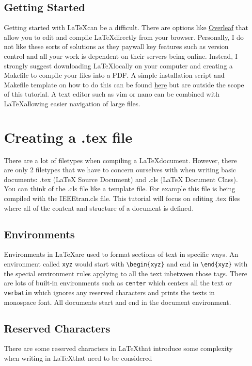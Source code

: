 \documentclass[12pt,journal,compsoc]{IEEEtran}
\begin{document}
\subsection{Getting Started}
Getting started with \LaTeX \space can be a difficult. There are options like \href{https://www.overleaf.com/}{Overleaf} that allow you to edit and compile \LaTeX \space directly from your browser. Personally, I do not like these sorts of solutions as they paywall key features such as version control and all your work is dependent on their servers being online. Instead, I strongly suggest downloading \LaTeX \space locally on your computer and creating a Makefile to compile your files into a PDF. A simple installation script and Makefile template on how to do this can be found \href{https://gist.github.com/ankitsxchdeva/1eb2afaad782a92b9a129a9452ae97bb}{here} but are outside the scope of this tutorial. A text editor such as vim or nano can be combined with \LaTeX \space allowing easier navigation of large files. 


\section{Creating a .tex file}
There are a lot of filetypes when compiling a \LaTeX \space document. However, there are only 2 filetypes that we have to concern ourselves with when writing basic documents: .tex (LaTeX Source Document) and .cls (LaTeX Document Class). You can think of the .cls file like a template file. For example this file is being compiled with the IEEEtran.cls file. This tutorial will focus on editing .tex files where all of the content and structure of a document is defined.

\subsection{Environments}
Environments in \LaTeX \space are used to format sections of text in specific ways. An environment called \verb|xyz| would start with \verb|\begin{xyz}| and end in \verb|\end{xyz}| with the special environment rules applying to all the text inbetween those tags. There are lots of built-in environments such as \verb|center| which centers all the text or \verb|verbatim| which ignores any reserved characters and prints the texts in monospace font. All documents start and end in the document environment.

\subsection{Reserved Characters}
There are some reserved characters in \LaTeX \space that introduce some complexity when writing in \LaTeX \space that need to be considered 
\end{document}
